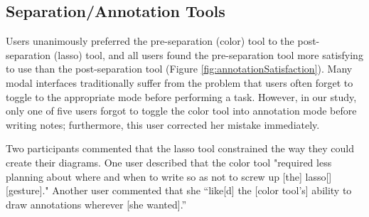 \documentclass{egpubl}
\begin{document}

 \subsection{Separation/Annotation Tools}



Users unanimously preferred the pre-separation (color) tool to the
post-separation (lasso) tool, and all users found the pre-separation
tool more satisfying to use than the post-separation tool (Figure
\ref{fig:annotationSatisfaction}).  Many modal interfaces
traditionally suffer from the problem that users often forget to
toggle to the appropriate mode before performing a task.  However, in
our study, only one of five users forgot to toggle the color tool into
annotation mode before writing notes; furthermore, this user corrected
her mistake immediately.

Two participants commented that the lasso tool constrained the way
they could create their diagrams.  One user described that
the color tool "required less planning about where and when to write
so as not to screw up [the] lasso[] [gesture]."  Another user
commented that she ``like[d] the [color tool's] ability to draw
annotations wherever [she wanted].''
\end{document}
